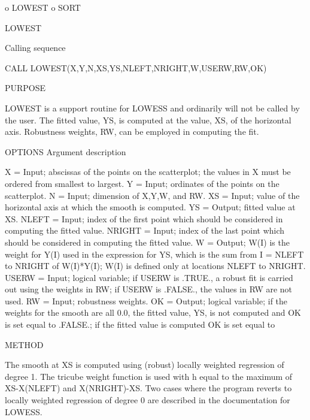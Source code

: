 \begin{DoxyVerb}  o LOWEST
  o SORT

LOWEST

Calling sequence

     CALL LOWEST(X,Y,N,XS,YS,NLEFT,NRIGHT,W,USERW,RW,OK)

PURPOSE

    LOWEST is a support routine for LOWESS and ordinarily will
    not be called by the user. The fitted value, YS, is
    computed at the value, XS, of the horizontal axis.
    Robustness weights, RW, can be employed in computing the
    fit.

OPTIONS
     Argument description

      X =       Input; abscissas of the points on the
                scatterplot; the values in X must be ordered
                from smallest to largest.
      Y =       Input; ordinates of the points on the
                scatterplot.
      N =       Input; dimension of X,Y,W, and RW.
      XS =      Input; value of the horizontal axis at which the
                smooth is computed.
      YS =      Output; fitted value at XS.
      NLEFT =   Input; index of the first point which should be
                considered in computing the fitted value.
      NRIGHT =  Input; index of the last point which should be
                considered in computing the fitted value.
      W =       Output; W(I) is the weight for Y(I) used in the
                expression for YS, which is the sum from
                I = NLEFT to NRIGHT of W(I)*Y(I); W(I) is
                defined only at locations NLEFT to NRIGHT.
      USERW =   Input; logical variable; if USERW is .TRUE., a
                robust fit is carried out using the weights in
                RW; if USERW is .FALSE., the values in RW are
                not used.
      RW =      Input; robustness weights.
      OK =      Output; logical variable; if the weights for the
                smooth are all 0.0, the fitted value, YS, is not
                computed and OK is set equal to .FALSE.; if the
                fitted value is computed OK is set equal to

METHOD

     The smooth at XS is computed using (robust) locally weighted
     regression of degree 1. The tricube weight function is used
     with h equal to the maximum of XS-X(NLEFT) and X(NRIGHT)-XS.
     Two cases where the program reverts to locally weighted
     regression of degree 0 are described in the documentation
     for LOWESS.
\end{DoxyVerb}


